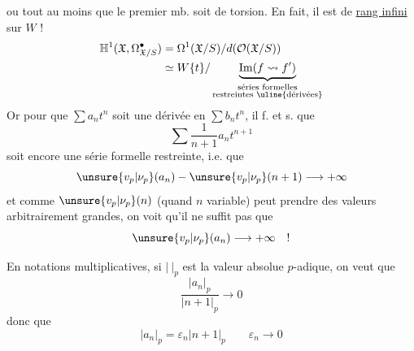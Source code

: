 
ou tout au moins que le premier mb. soit de torsion. En fait, il est de \uline{rang infini} sur $W$ !
\[
\begin{aligned}
\mathbb H^1(\mathfrak X,\Omega^\bullet_{\mathfrak X/S})
&=\Omega^1(\mathfrak X/S)/d(\mathcal O(\mathfrak X/S))\\
&\simeq W\{t\}/\underbrace{\operatorname{Im}(f\rightsquigarrow f')}_{\substack{\text{séries formelles}\\\text{restreintes }\uline{\text{dérivées}}}}
\end{aligned}
\]
Or pour que $\sum a_n t^n$ soit une dérivée en $\sum b_n t^n$, il f. et s. que
\[
\sum\frac1{n+1}a_n t^{n+1}
\]
soit encore une série formelle restreinte, i.e. que
\[
\unsure{v_p|\nu_p}(a_n)-\unsure{v_p|\nu_p}(n+1)\longrightarrow+\infty
\]
et comme $\unsure{v_p|\nu_p}(n)$ (quand $n$ variable) peut prendre des valeurs arbitrairement grandes, on voit qu'il ne suffit pas que
\[
\unsure{v_p|\nu_p}(a_n)\longrightarrow+\infty\quad !
\]

En notations multiplicatives, si $|\ |_{p}$ est la valeur absolue $p$-adique,  on veut que
\[
\frac{|a_n|_p}{|n+1|_p}\longrightarrow 0
\]
donc que
\[
|a_n|_p=\varepsilon_n|n+1|_p\qquad \varepsilon_n\longrightarrow 0
\]


